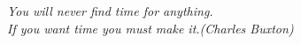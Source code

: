 \begin{epigrafe}[]
    \vspace*{\fill}
	\begin{flushright}
	
		\textit{You will never find time for anything.\\
		If you want time you must make it.(Charles Buxton)}
		
	\end{flushright}
\end{epigrafe}
